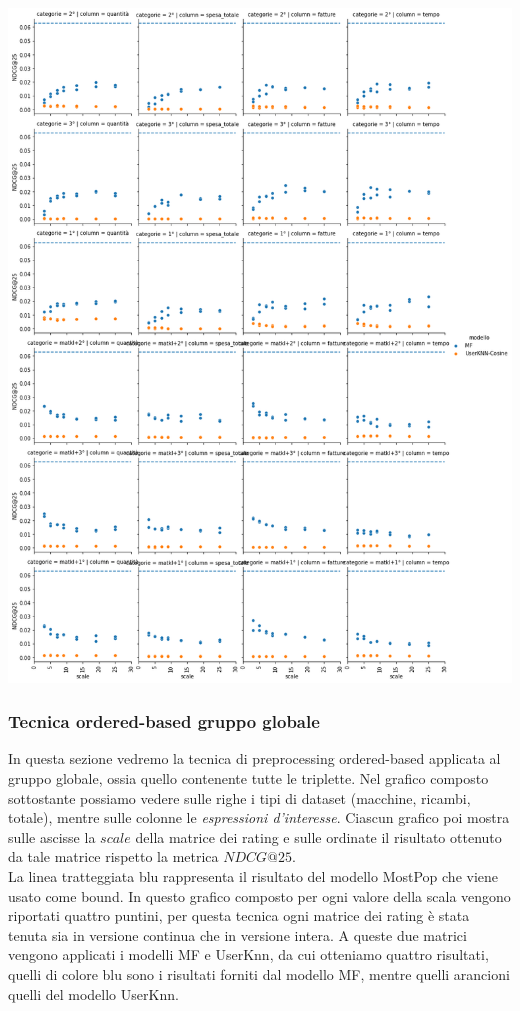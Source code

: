 \includegraphics[width=16cm]{figures/risultati_minmax_categoria_totale.png}


\subsubsection{Tecnica ordered-based gruppo globale}
In questa sezione vedremo la tecnica di preprocessing ordered-based applicata al gruppo globale, ossia quello contenente tutte le triplette.
Nel grafico composto sottostante possiamo vedere sulle righe i tipi di dataset (macchine, ricambi, totale), mentre sulle colonne le \textit{espressioni d'interesse}. Ciascun grafico poi mostra sulle ascisse la $scale$ della matrice dei rating e sulle ordinate il risultato ottenuto da tale matrice rispetto la metrica $NDCG@25$. \\
La linea tratteggiata blu rappresenta il risultato del modello MostPop che viene usato come bound.
In questo grafico composto per ogni valore della scala vengono riportati quattro puntini, per questa tecnica ogni matrice dei rating è stata tenuta sia in versione continua che in versione intera. A queste due matrici vengono applicati i modelli MF e UserKnn, da cui otteniamo quattro risultati, quelli di colore blu sono i risultati forniti dal modello MF, mentre quelli arancioni quelli del modello UserKnn.

